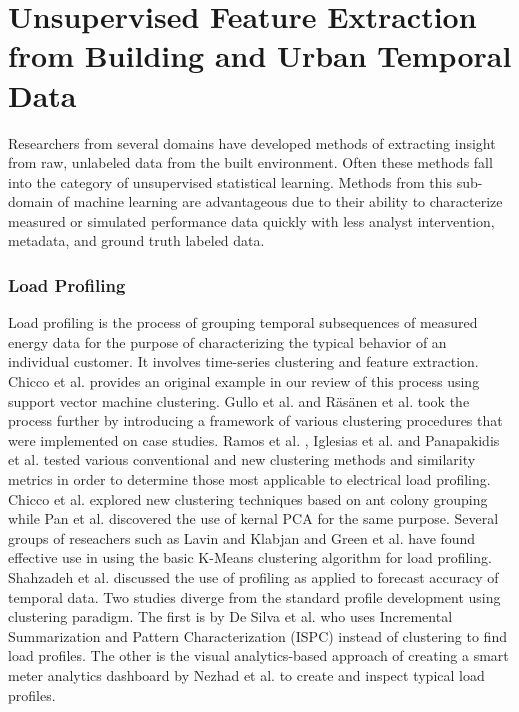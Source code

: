 \section{Unsupervised Feature Extraction from Building and Urban Temporal Data}
\label{sec:litreview}

Researchers from several domains have developed methods of extracting insight from raw, unlabeled data from the built environment. Often these methods fall into the category of unsupervised statistical learning. Methods from this sub-domain of machine learning are advantageous due to their ability to characterize measured or simulated performance data quickly with less analyst intervention, metadata, and ground truth labeled data. 

\subsubsection{Load Profiling}
Load profiling is the process of grouping temporal subsequences of measured energy data for the purpose of characterizing the typical behavior of an individual customer. It involves time-series clustering and feature extraction. Chicco et al. \cite{chicco_support_2009} provides an original example in our review of this process using support vector machine clustering. Gullo et al. \cite{gullo_low-voltage_2009} and R\"as\"anen et al. \cite{rasanen_feature-based_2009} took the process further by introducing a framework of various clustering procedures that were implemented on case studies. Ramos et al. \cite{ramos_typical_2012}, Iglesias et al. \cite{iglesias_analysis_2013} and Panapakidis et al. \cite{panapakidis_evaluation_2015} tested various conventional and new clustering methods and similarity metrics in order to determine those most applicable to electrical load profiling. Chicco et al. \cite{chicco_electrical_2013} explored new clustering techniques based on ant colony grouping while Pan et al. \cite{pan_kernel-based_2015} discovered the use of kernal PCA for the same purpose. Several groups of reseachers such as Lavin and Klabjan \cite{lavin_clustering_2014} and Green et al. \cite{green_divide_2014} have found effective use in using the basic K-Means clustering algorithm for load profiling. Shahzadeh et al. \cite{shahzadeh_improving_2015} discussed the use of profiling as applied to forecast accuracy of temporal data. Two studies diverge from the standard profile development using clustering paradigm. The first is by De Silva et al. \cite{de_silva_data_2011} who uses Incremental Summarization and Pattern Characterization (ISPC) instead of clustering to find load profiles. The other is the visual analytics-based approach of creating a smart meter analytics dashboard by Nezhad et al. \cite{jarrah_nezhad_smartd:_2014} to create and inspect typical load profiles.


